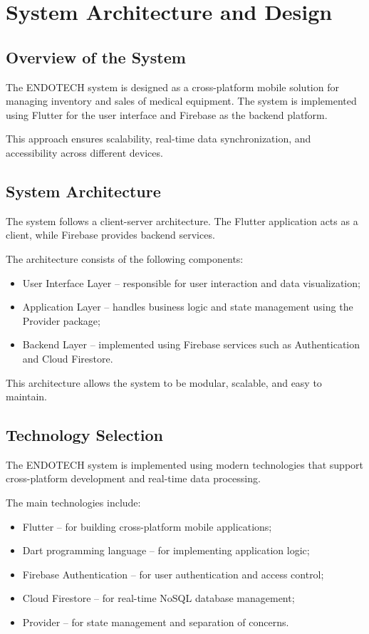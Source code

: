 \chapter{System Architecture and Design}

\section{Overview of the System}

The ENDOTECH system is designed as a cross-platform mobile solution for managing inventory and sales of medical equipment. The system is implemented using Flutter for the user interface and Firebase as the backend platform.

This approach ensures scalability, real-time data synchronization, and accessibility across different devices.

\section{System Architecture}

The system follows a client-server architecture. The Flutter application acts as a client, while Firebase provides backend services.

The architecture consists of the following components:

\begin{itemize}
    \item User Interface Layer – responsible for user interaction and data visualization;
    \item Application Layer – handles business logic and state management using the Provider package;
    \item Backend Layer – implemented using Firebase services such as Authentication and Cloud Firestore.
\end{itemize}

This architecture allows the system to be modular, scalable, and easy to maintain.

\section{Technology Selection}

The ENDOTECH system is implemented using modern technologies that support cross-platform development and real-time data processing.

The main technologies include:

\begin{itemize}
    \item Flutter – for building cross-platform mobile applications;
    \item Dart programming language – for implementing application logic;
    \item Firebase Authentication – for user authentication and access control;
    \item Cloud Firestore – for real-time NoSQL database management;
    \item Provider – for state management and separation of concerns.
\end{itemize}

